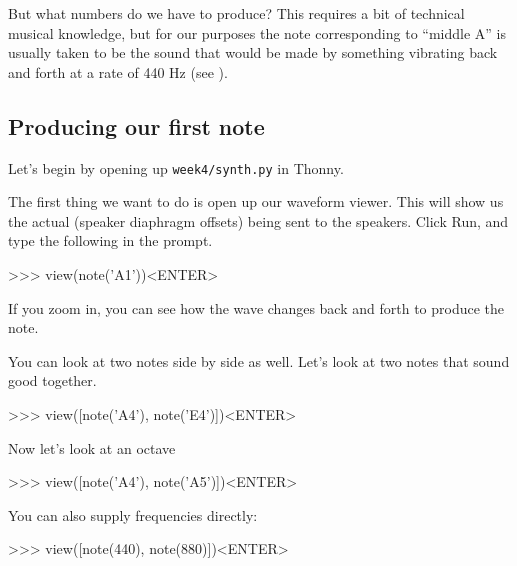 But what numbers do we have to produce? This requires a bit of technical musical knowledge, but for
our purposes the note corresponding to ``middle A'' is usually taken to be the sound that would be
made by something vibrating back and forth at a rate of 440 Hz
(see ).

\subsection{Producing our first note}

Let's begin by opening up \texttt{week4/synth.py} in Thonny.

The first thing we want to do is open up our waveform viewer. This will show us the actual
 (speaker diaphragm offsets) being sent to the speakers. Click Run, and type the
following in the prompt.

\begin{replbox}
>>> view(note('A1'))<ENTER>
\end{replbox}

If you zoom in, you can see how the wave changes back and forth to produce the note.

You can look at two notes side by side as well. Let's look at two notes that sound good together.
\begin{replbox}
>>> view([note('A4'), note('E4')])<ENTER>
\end{replbox}

Now let's look at an octave
\begin{replbox}
>>> view([note('A4'), note('A5')])<ENTER>
\end{replbox}

You can also supply frequencies directly:
\begin{replbox}
>>> view([note(440), note(880)])<ENTER>
\end{replbox}

